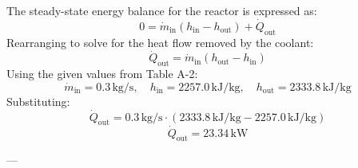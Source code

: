 The steady-state energy balance for the reactor is expressed as:  
\[
0 = \dot{m}_{\text{in}} \left( h_{\text{in}} - h_{\text{out}} \right) + \dot{Q}_{\text{out}}
\]  
Rearranging to solve for the heat flow removed by the coolant:  
\[
\dot{Q}_{\text{out}} = \dot{m}_{\text{in}} \left( h_{\text{out}} - h_{\text{in}} \right)
\]  
Using the given values from Table A-2:  
\[
\dot{m}_{\text{in}} = 0.3 \, \text{kg/s}, \quad h_{\text{in}} = 2257.0 \, \text{kJ/kg}, \quad h_{\text{out}} = 2333.8 \, \text{kJ/kg}
\]  
Substituting:  
\[
\dot{Q}_{\text{out}} = 0.3 \, \text{kg/s} \cdot \left( 2333.8 \, \text{kJ/kg} - 2257.0 \, \text{kJ/kg} \right)
\]  
\[
\dot{Q}_{\text{out}} = 23.34 \, \text{kW}
\]  

---